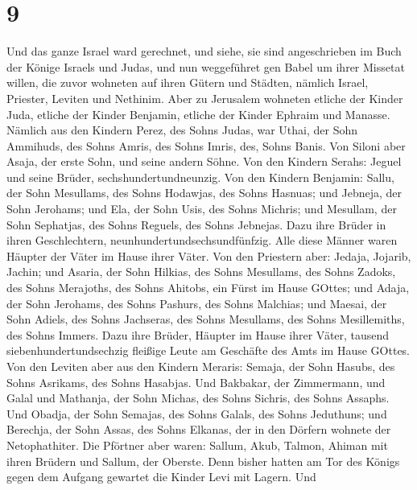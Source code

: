 \hypertarget{section-8}{%
\section{9}\label{section-8}}

 Und das ganze Israel ward gerechnet, und siehe, sie sind
angeschrieben im Buch der Könige Israels und Judas, und nun weggeführet
gen Babel um ihrer Missetat willen,  die zuvor wohneten auf
ihren Gütern und Städten, nämlich Israel, Priester, Leviten und
Nethinim.  Aber zu Jerusalem wohneten etliche der Kinder
Juda, etliche der Kinder Benjamin, etliche der Kinder Ephraim und
Manasse.  Nämlich aus den Kindern Perez, des Sohns Judas,
war Uthai, der Sohn Ammihuds, des Sohns Amris, des Sohns Imris, des,
Sohns Banis.  Von Siloni aber Asaja, der erste Sohn, und
seine andern Söhne.  Von den Kindern Serahs: Jeguel und
seine Brüder, sechshundertundneunzig.  Von den Kindern
Benjamin: Sallu, der Sohn Mesullams, des Sohns Hodawjas, des Sohns
Hasnuas;  und Jebneja, der Sohn Jerohams; und Ela, der Sohn
Usis, des Sohns Michris; und Mesullam, der Sohn Sephatjas, des Sohns
Reguels, des Sohns Jebnejas.  Dazu ihre Brüder in ihren
Geschlechtern, neunhundertundsechsundfünfzig. Alle diese Männer waren
Häupter der Väter im Hause ihrer Väter.  Von den Priestern
aber: Jedaja, Jojarib, Jachin;  und Asaria, der Sohn
Hilkias, des Sohns Mesullams, des Sohns Zadoks, des Sohns Merajoths, des
Sohns Ahitobs, ein Fürst im Hause GOttes;  und Adaja, der
Sohn Jerohams, des Sohns Pashurs, des Sohns Malchias; und Maesai, der
Sohn Adiels, des Sohns Jachseras, des Sohns Mesullams, des Sohns
Mesillemiths, des Sohns Immers.  Dazu ihre Brüder, Häupter
im Hause ihrer Väter, tausend siebenhundertundsechzig fleißige Leute am
Geschäfte des Amts im Hause GOttes.  Von den Leviten aber
aus den Kindern Meraris: Semaja, der Sohn Hasubs, des Sohns Asrikams,
des Sohns Hasabjas.  Und Bakbakar, der Zimmermann, und
Galal und Mathanja, der Sohn Michas, des Sohns Sichris, des Sohns
Assaphs.  Und Obadja, der Sohn Semajas, des Sohns Galals,
des Sohns Jeduthuns; und Berechja, der Sohn Assas, des Sohns Elkanas,
der in den Dörfern wohnete der Netophathiter.  Die Pförtner
aber waren: Sallum, Akub, Talmon, Ahiman mit ihren Brüdern und Sallum,
der Oberste.  Denn bisher hatten am Tor des Königs gegen
dem Aufgang gewartet die Kinder Levi mit Lagern.  Und
